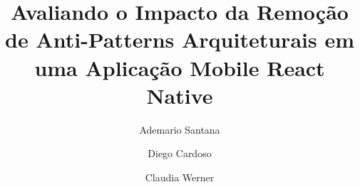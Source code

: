 \documentclass[sigconf,anonymous]{acmart}
\begin{document}
\title{Avaliando o Impacto da Remoção de Anti-Patterns Arquiteturais em uma Aplicação Mobile React Native}

\author{Ademario Santana}
\email{[email]}

\author{Diego Cardoso}
\email{[email]}

\author{Claudia Werner}
\email{[email]}

\renewcommand{\shortauthors}{Santana et al.}
\renewcommand{\shorttitle}{Remoção de Anti-Patterns Arquiteturais em React Native}
\end{document}

